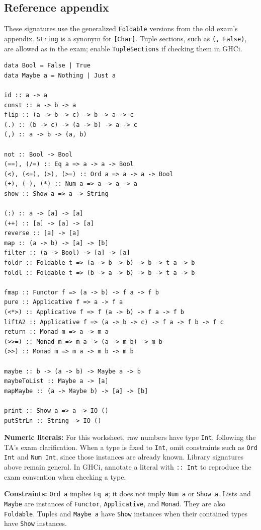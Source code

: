 \documentclass[11pt]{article}
\begin{document}
\subsection*{Reference appendix}
These signatures use the generalized \texttt{Foldable} versions from
the old exam's appendix. \texttt{String} is a synonym for \texttt{[Char]}.
Tuple sections, such as \texttt{(, False)}, are allowed as in the exam;
enable \texttt{TupleSections} if checking them in GHCi.

\begin{lstlisting}
data Bool = False | True
data Maybe a = Nothing | Just a

id :: a -> a
const :: a -> b -> a
flip :: (a -> b -> c) -> b -> a -> c
(.) :: (b -> c) -> (a -> b) -> a -> c
(,) :: a -> b -> (a, b)

not :: Bool -> Bool
(==), (/=) :: Eq a => a -> a -> Bool
(<), (<=), (>), (>=) :: Ord a => a -> a -> Bool
(+), (-), (*) :: Num a => a -> a -> a
show :: Show a => a -> String

(:) :: a -> [a] -> [a]
(++) :: [a] -> [a] -> [a]
reverse :: [a] -> [a]
map :: (a -> b) -> [a] -> [b]
filter :: (a -> Bool) -> [a] -> [a]
foldr :: Foldable t => (a -> b -> b) -> b -> t a -> b
foldl :: Foldable t => (b -> a -> b) -> b -> t a -> b

fmap :: Functor f => (a -> b) -> f a -> f b
pure :: Applicative f => a -> f a
(<*>) :: Applicative f => f (a -> b) -> f a -> f b
liftA2 :: Applicative f => (a -> b -> c) -> f a -> f b -> f c
return :: Monad m => a -> m a
(>>=) :: Monad m => m a -> (a -> m b) -> m b
(>>) :: Monad m => m a -> m b -> m b

maybe :: b -> (a -> b) -> Maybe a -> b
maybeToList :: Maybe a -> [a]
mapMaybe :: (a -> Maybe b) -> [a] -> [b]

print :: Show a => a -> IO ()
putStrLn :: String -> IO ()
\end{lstlisting}
\textbf{Numeric literals:} For this worksheet, raw numbers have type
\texttt{Int}, following the TA's exam clarification. When a type is
fixed to \texttt{Int}, omit constraints such as \texttt{Ord Int} and
\texttt{Num Int}, since those instances are already known. Library
signatures above remain general. In GHCi, annotate a literal with
\texttt{:: Int} to reproduce the exam convention when checking a type.

\textbf{Constraints:} \texttt{Ord a} implies \texttt{Eq a}; it does not
imply \texttt{Num a} or \texttt{Show a}. Lists and \texttt{Maybe} are
instances of \texttt{Functor}, \texttt{Applicative}, and \texttt{Monad}.
They are also \texttt{Foldable}. Tuples and \texttt{Maybe a} have
\texttt{Show} instances when their contained types have \texttt{Show}
instances.
\end{document}
